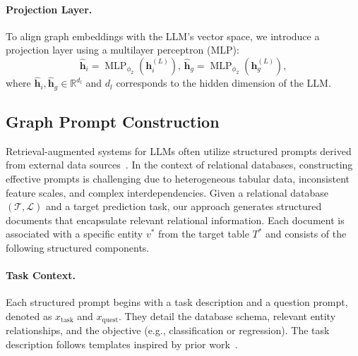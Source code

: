 \documentclass[11pt]{article}
\begin{document}
\paragraph{Projection Layer.} To align graph embeddings with the LLM’s vector space, we introduce a projection layer using a multilayer perceptron (MLP):
\begin{equation}
    \hat{\mathbf{h}}_i=\operatorname{MLP}_{\phi_2}\left(\mathbf{h}_i^{(L)}\right),\, \hat{\mathbf{h}}_g=\operatorname{MLP}_{\phi_2}\left(\mathbf{h}_g^{(L)}\right) ,
\end{equation}
where $\hat{\mathbf{h}}_i, \hat{\mathbf{h}}_g \in \mathbb{R}^{d_l}$ and $d_l$ corresponds to the hidden dimension of the LLM.

\subsection{Graph Prompt Construction}
Retrieval-augmented systems for LLMs often utilize structured prompts derived from external data sources~\citep{sundar2023ctbls, qin2022external, ye2023large,wu2024insertgnn}. In the context of relational databases, constructing effective prompts is challenging due to heterogeneous tabular data, inconsistent feature scales, and complex interdependencies. Given a relational database $(\mathcal{T}, \mathcal{L})$ and a target prediction task, our approach generates structured documents that encapsulate relevant relational information. Each document is associated with a specific entity $v^*$ from the target table $T^*$ and consists of the following structured components.

\paragraph{Task Context.} Each structured prompt begins with a task description and a question prompt, denoted as $x_{\mathrm{task}}$ and $x_{\mathrm{quest}}$. They detail the database schema, relevant entity relationships, and the objective (e.g., classification or regression). The task description follows templates inspired by prior work~\citep{robinson2024relbench}. 
\end{document}
